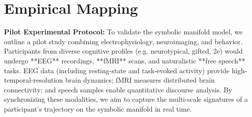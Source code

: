 \section*{Empirical Mapping}
\noindent\textbf{Pilot Experimental Protocol:} To validate the symbolic manifold model, we outline a pilot study combining electrophysiology, neuroimaging, and behavior. Participants from diverse cognitive profiles (e.g. neurotypical, gifted, 2e) would undergo **EEG** recordings, **fMRI** scans, and naturalistic **free speech** tasks. EEG data (including resting-state and task-evoked activity) provide high-temporal-resolution brain dynamics; fMRI measures distributed brain connectivity; and speech samples enable quantitative discourse analysis. By synchronizing these modalities, we aim to capture the multi-scale signatures of a participant’s trajectory on the symbolic manifold in real time.

